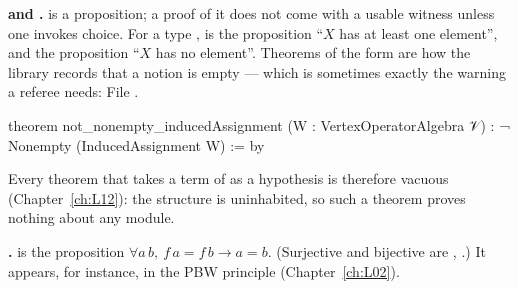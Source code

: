 \textbf{ and .}  is a proposition; a proof of it does not
come with a usable witness unless one invokes choice. For a type ,
 is the proposition ``$X$ has at least one element'', and  the
proposition ``$X$ has no element''. Theorems of the form  are how the library
records that a notion is empty --- which is sometimes exactly the warning a referee needs:
\noindent File .
\begin{leancode}
theorem not_nonempty_inducedAssignment (W : VertexOperatorAlgebra 𝒱) :
    ¬ Nonempty (InducedAssignment W) := by
\end{leancode}
Every theorem that takes a term of  as a hypothesis is therefore vacuous
(Chapter~\ref{ch:L12}): the structure is uninhabited, so such a theorem proves nothing about any module.

\textbf{.}  is the proposition
$\forall a\,b,\ f\,a = f\,b\to a = b$. (Surjective and bijective are ,
.) It appears, for instance, in the PBW principle  (Chapter~\ref{ch:L02}).

